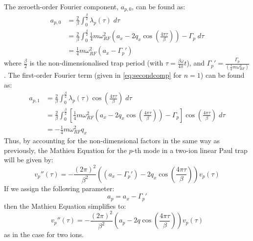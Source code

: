 \documentclass{article}
\begin{document}
\medskip
\noindent The zeroeth-order Fourier component, $a_{p,0}$, can be found as:
\begin{align*}
a_{p,0} & = \frac{2}{\beta} \int_0^{\frac{\beta}{2}} \lambda_p (\tau) \; d \tau \\
& =  \frac{2}{\beta} \int_0^{\frac{\beta}{2}} \frac{1}{4} m \omega_{RF}^2 \left(a_x - 2 q_x \cos(\frac{4 \pi \tau}{\beta}) \right) - \Gamma_p \; d \tau \\
& = \frac{1}{4} m \omega_{RF}^2 \left( a_x - \Gamma_p' \right) 
\end{align*}
where $\frac{\beta}{2}$ is the non-dimensionalised trap period (with $\tau = \frac{\beta \omega}{4 \pi} t$), and $\Gamma_p' = \frac{\Gamma_p}{\left( \frac{1}{4} m \omega_{RF}^2 \right)}$. The first-order Fourier term (given in \eqref{eq:secondcomp} for $n = 1$) can be found as:
\begin{align*}
a_{p,1} & = \frac{2}{\beta} \int_0^{\frac{\beta}{2}} \lambda_p (\tau) \cos(\frac{4 \pi \tau}{\beta}) \; d \tau \\
& =  \frac{2}{\beta} \int_0^{\frac{\beta}{2}} \left[ \frac{1}{4} m \omega_{RF}^2 \left(a_x - 2 q_x \cos(\frac{4 \pi \tau}{\beta}) \right) - \Gamma_p \right] \cos(\frac{4 \pi \tau}{\beta}) \; d \tau \\
& = - \frac{1}{4} m \omega_{RF}^2 q_x 
\end{align*}
Thus, by accounting for the non-dimensional factors in the same way as previously, the Mathieu Equation for the $p$-th mode in a two-ion linear Paul trap will be given by: 
\begin{equation}
	v_p '' (\tau) = - \frac{(2 \pi)^2}{\beta^2} \left( \left( a_x - \Gamma_p' \right) - 2 q_x \cos (\frac{4 \pi \tau}{\beta}) \right)	v_p (\tau)
\end{equation}
If we assign the following parameter:
\begin{equation}
a_p = a_x - \Gamma_p'
\end{equation}
then the Mathieu Equation simplifies to:
\begin{equation}
v_p '' (\tau) = - \frac{(2 \pi)^2}{\beta^2} \left( a_p - 2 q \cos \left( \frac{4 \pi \tau}{\beta} \right) \right)	 v_p (\tau)
\end{equation}
as in the case for two ions. 
\end{document}
